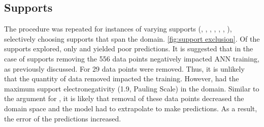 	\subsection{Supports}
	The procedure was repeated for instances of varying supports (, , , , , , ), selectively choosing supports that span the domain. \ref{fig:support exclusion}. Of the supports explored, only  and  yielded poor predictions. It is suggested that in the case of  supports removing the 556 data points negatively impacted ANN training, as previously discussed. For  29 data points were removed. Thus, it is unlikely that the quantity of data removed impacted the training. However,  had the maximum support electronegativity (1.9, Pauling Scale) in the domain. Similar to the argument for , it is likely that removal of these data points decreased the domain space and the model had to extrapolate to make predictions. As a result, the error of the predictions increased. 
